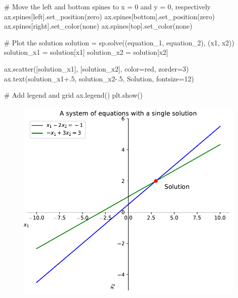 \documentclass[
  letterpaper,
  DIV=11,
  numbers=noendperiod]{scrreprt}
\newenvironment{Shaded}{\begin{snugshade}}{\end{snugshade}}
\newcommand{\CommentTok}[1]{\textcolor[rgb]{0.37,0.37,0.37}{#1}}
\newcommand{\DecValTok}[1]{\textcolor[rgb]{0.68,0.00,0.00}{#1}}
\newcommand{\FloatTok}[1]{\textcolor[rgb]{0.68,0.00,0.00}{#1}}
\newcommand{\NormalTok}[1]{\textcolor[rgb]{0.00,0.23,0.31}{#1}}
\newcommand{\OperatorTok}[1]{\textcolor[rgb]{0.37,0.37,0.37}{#1}}
\newcommand{\StringTok}[1]{\textcolor[rgb]{0.13,0.47,0.30}{#1}}
\begin{document}
\begin{Shaded}
\begin{Highlighting}[]
\CommentTok{\# Move the left and bottom spines to x = 0 and y = 0, respectively}
\NormalTok{ax.spines[}\StringTok{\textquotesingle{}left\textquotesingle{}}\NormalTok{].set\_position(}\StringTok{\textquotesingle{}zero\textquotesingle{}}\NormalTok{)}
\NormalTok{ax.spines[}\StringTok{\textquotesingle{}bottom\textquotesingle{}}\NormalTok{].set\_position(}\StringTok{\textquotesingle{}zero\textquotesingle{}}\NormalTok{)}
\NormalTok{ax.spines[}\StringTok{\textquotesingle{}right\textquotesingle{}}\NormalTok{].set\_color(}\StringTok{\textquotesingle{}none\textquotesingle{}}\NormalTok{)}
\NormalTok{ax.spines[}\StringTok{\textquotesingle{}top\textquotesingle{}}\NormalTok{].set\_color(}\StringTok{\textquotesingle{}none\textquotesingle{}}\NormalTok{)}

\CommentTok{\# Plot the solution}
\NormalTok{solution }\OperatorTok{=}\NormalTok{ sp.solve((equation\_1, equation\_2), (x1, x2))}
\NormalTok{solution\_x1 }\OperatorTok{=}\NormalTok{ solution[x1]}
\NormalTok{solution\_x2 }\OperatorTok{=}\NormalTok{ solution[x2]}

\NormalTok{ax.scatter([solution\_x1], [solution\_x2], color}\OperatorTok{=}\StringTok{\textquotesingle{}red\textquotesingle{}}\NormalTok{, zorder}\OperatorTok{=}\DecValTok{3}\NormalTok{)  }
\NormalTok{ax.text(solution\_x1}\OperatorTok{+}\FloatTok{.5}\NormalTok{, solution\_x2}\OperatorTok{{-}}\FloatTok{.5}\NormalTok{, }\StringTok{\textquotesingle{}  Solution\textquotesingle{}}\NormalTok{, fontsize}\OperatorTok{=}\DecValTok{12}\NormalTok{)}

\CommentTok{\# Add legend and grid}
\NormalTok{ax.legend()}
\NormalTok{plt.show()}
\end{Highlighting}
\end{Shaded}

\begin{figure}[H]

{\centering \includegraphics{p1_files/figure-pdf/cell-5-output-1.pdf}

}

\end{figure}
\end{document}
